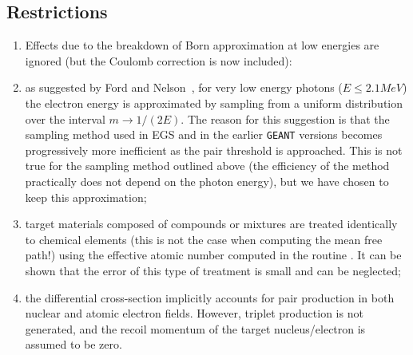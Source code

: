 \subsection{Restrictions}
\begin{enumerate}
\item
Effects due to the breakdown of Born approximation at low energies
are ignored (but the Coulomb correction is now included):
\item
as suggested by Ford and Nelson~\cite{bib-EGS4}, for very low energy 
photons ($E\leq 2.1 MeV$) the electron energy is approximated by sampling 
from a uniform distribution over the interval $ m\rightarrow 1/(2E)$.
The reason for this suggestion is that the sampling method used in 
EGS and in the earlier {\tt GEANT} versions becomes progressively more 
inefficient as the pair threshold is approached. This is not true for 
the sampling method outlined above (the efficiency of the method 
practically does not depend on the photon energy), but we
have chosen to keep this approximation;
\item
target materials composed of compounds or mixtures are treated identically
to chemical elements (this is not the case when computing the mean free path!)
using the effective atomic number computed in the routine . 
It can be shown that the error of this type of treatment is small and can 
be neglected;
\item
the differential cross-section implicitly accounts for pair production
in both nuclear and atomic electron fields. However, triplet production
is not generated, and the recoil momentum of the target nucleus/electron
is assumed to be zero.
\end{enumerate}
